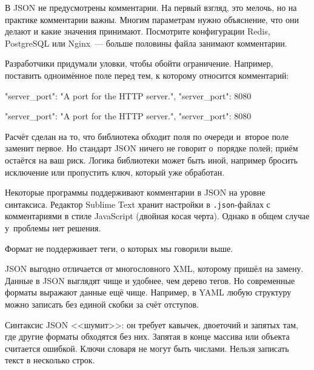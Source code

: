 В JSON не предусмотрены комментарии. На первый взгляд, это мелочь, но на
практике комментарии важны. Многим параметрам нужно объяснение, что они делают и
какие значения принимают. Посмотрите конфигурации Redis, PostgreSQL или
Nginx~--- больше половины файла занимают комментарии.

Разработчики придумали уловки, чтобы обойти ограничение. Например, поставить
одноимённое поле перед тем, к которому относится комментарий:

\ifx\DEVICETYPE\MOBILE

\begin{english}
  \begin{json}
{
    "server_port":
    "A port for the HTTP server.",
    "server_port": 8080
}
  \end{json}
\end{english}

\else

\begin{english}
  \begin{json}
{
    "server_port": "A port for the HTTP server.",
    "server_port": 8080
}
  \end{json}
\end{english}
\fi


Расчёт сделан на то, что библиотека обходит поля по очереди и~второе поле
заменит первое. Но стандарт JSON ничего не говорит о~порядке полей; приём
остаётся на ваш риск. Логика библиотеки может быть иной, например бросить
исключение или пропустить ключ, который уже обработан.

Некоторые программы поддерживают комментарии в JSON на уровне синтаксиса.
Редактор Sublime Text хранит настройки в \verb|.json|-файлах с комментариями в
стиле JavaScript (двойная косая черта).  Однако в общем случае у~проблемы нет
решения.


Формат не поддерживает теги, о которых мы говорили выше.

JSON выгодно отличается от многословного XML, которому пришёл на замену. Данные
в JSON выглядят чище и удобнее, чем дерево тегов. Но современные форматы
выражают данные ещё чище. Например, в YAML любую структуру можно записать без
единой скобки за счёт отступов.

Синтаксис JSON <<шумит>>: он требует кавычек, двоеточий и запятых там, где
другие форматы обходятся без них. Запятая в конце массива или объекта считается
ошибкой. Ключи словаря не могут быть числами. Нельзя записать текст в несколько
строк.

